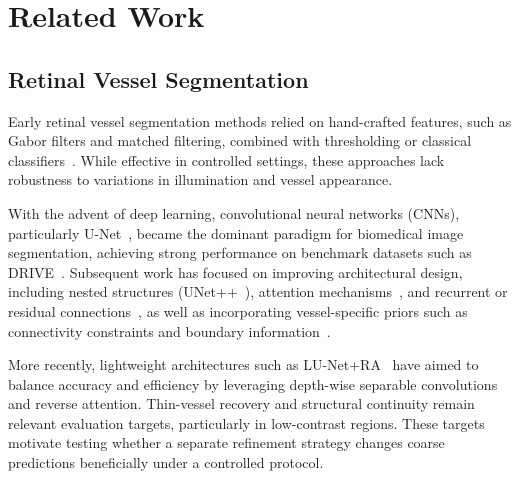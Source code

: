 \documentclass[jimaging,article,submit,pdftex,moreauthors]{Definitions/mdpi}%
\begin{document}








\section{Related Work}

\label{sec:related}



\subsection{Retinal Vessel Segmentation}



Early retinal vessel segmentation methods relied on hand-crafted features, such as Gabor filters and matched filtering, combined with thresholding or classical classifiers~\cite{Soares2006, Mendonca2006}. While effective in controlled settings, these approaches lack robustness to variations in illumination and vessel appearance.



With the advent of deep learning, convolutional neural networks (CNNs), particularly U-Net~\cite{Ronneberger2015}, became the dominant paradigm for biomedical image segmentation, achieving strong performance on benchmark datasets such as DRIVE~\cite{Staal2004}. Subsequent work has focused on improving architectural design, including nested structures (UNet++~\cite{Zhou2018UNetpp}), attention mechanisms~\cite{Oktay2018AttUNet, Schlemper2019AG}, and recurrent or residual connections~\cite{Alom2018R2UNet}, as well as incorporating vessel-specific priors such as connectivity constraints and boundary information~\cite{Fu2016DeepVessel, Liskowski2016, Shin2019Connectivity}.



More recently, lightweight architectures such as LU-Net+RA~\cite{Hernandez2025} have aimed to balance accuracy and efficiency by leveraging depth-wise separable convolutions and reverse attention. Thin-vessel recovery and structural continuity remain relevant evaluation targets, particularly in low-contrast regions. These targets motivate testing whether a separate refinement strategy changes coarse predictions beneficially under a controlled protocol.
\end{document}
